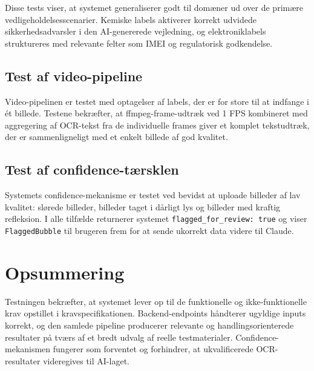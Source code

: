 Disse tests viser, at systemet generaliserer godt til domæner ud over de primære vedligeholdelsesscenarier. Kemiske labels aktiverer korrekt udvidede sikkerhedsadvarsler i den AI-genererede vejledning, og elektroniklabels struktureres med relevante felter som IMEI og regulatorisk godkendelse.

\subsection{Test af video-pipeline}
\label{subsec:video-test}

Video-pipelinen er testet med optagelser af labels, der er for store til at indfange i ét billede. Testene bekræfter, at ffmpeg-frame-udtræk ved 1 FPS kombineret med aggregering af OCR-tekst fra de individuelle frames giver et komplet tekstudtræk, der er sammenligneligt med et enkelt billede af god kvalitet.

\subsection{Test af confidence-tærsklen}
\label{subsec:confidence-test}

Systemets confidence-mekanisme er testet ved bevidst at uploade billeder af lav kvalitet: slørede billeder, billeder taget i dårligt lys og billeder med kraftig refleksion. I alle tilfælde returnerer systemet \texttt{flagged\_for\_review: true} og viser \texttt{FlaggedBubble} til brugeren frem for at sende ukorrekt data videre til Claude.

\section{Opsummering}
\label{sec:test-opsummering}

Testningen bekræfter, at systemet lever op til de funktionelle og ikke-funktionelle krav opstillet i kravspecifikationen. Backend-endpoints håndterer ugyldige inputs korrekt, og den samlede pipeline producerer relevante og handlingsorienterede resultater på tværs af et bredt udvalg af reelle testmaterialer. Confidence-mekanismen fungerer som forventet og forhindrer, at ukvalificerede OCR-resultater videregives til AI-laget.
